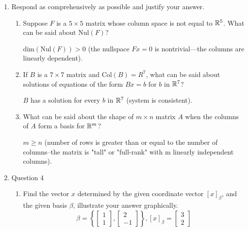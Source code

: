 \documentclass{zc-ust-hw}
\begin{document}
\begin{enumerate}
\begin{enumerate}
    \end{enumerate}

  \item Respond as comprehensively as possible and justify your answer.
    \begin{enumerate}
      \item Suppose $F$ is a $5\times 5$ matrix whose column space is not equal to
        $\mathbb{R}^{5}$. What can be said about $\text{Nul}(F)$? 
        \begin{sol}
          $\text{dim}(\text{Nul}(F)) > 0$ (the nullspace $Fx=0$ is nontrivial---the columns are linearly dependent).
        \end{sol}
      \item If $B$ is a $7\times 7$ matrix and $\text{Col}(B)=R^{7}$, what can
        be said about solutions of equations of the form
        $Bx=b$ for $b$ in $\mathbb{R}^{7}$?
        \begin{sol}
          $B$ has a solution for every $b$ in $\mathbb{R}^{7}$ (system is consistent).
        \end{sol}
      \item What can be said about the shape of  $m\times n$ matrix $A$
        when the columns of $A$ form a basis for $\mathbb{R}^{m}$?
        \begin{sol}
          $m \geq n$ (number of rows is greater than or equal to the number of
          columns--the matrix is "tall" or "full-rank" with m linearly independent columns).
        \end{sol}
    \end{enumerate}

  \item Question 4
    \begin{enumerate}
      \item Find the vector $x$ determined by the given coordinate vector $[x]_\beta$, and
        the given basis $\beta$, illustrate your answer graphically. 
        \begin{equation*}
          \beta=\left\{ \begin{bmatrix} 1\\1 \end{bmatrix}, \begin{bmatrix} 2\\-1 \end{bmatrix}  \right\}, [x]_\beta=\begin{bmatrix} 3\\2 \end{bmatrix} 
        \end{equation*}


\end{enumerate}
\end{enumerate}
\end{document}
